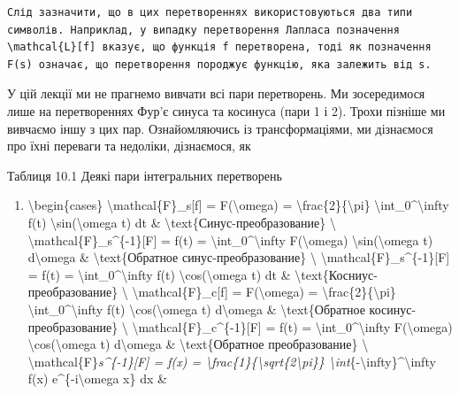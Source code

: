 \documentclass[
]{article}
\providecommand{\tightlist}{%
  \setlength{\itemsep}{0pt}\setlength{\parskip}{0pt}}
\begin{document}
\begin{verbatim}
Слід зазначити, що в цих перетвореннях використовуються два типи символів. Наприклад, у випадку перетворення Лапласа позначення \mathcal{L}[f] вказує, що функція f перетворена, тоді як позначення F(s) означає, що перетворення породжує функцію, яка залежить від s.
\end{verbatim}

У цій лекції ми не прагнемо вивчати всі пари перетворень. Ми
зосередимося лише на перетвореннях Фур'є синуса та косинуса (пари 1 і
2). Трохи пізніше ми вивчаємо іншу з цих пар. Ознайомляючись із
трансформаціями, ми дізнаємося про їхні переваги та недоліки,
дізнаємося, як

Таблиця 10.1 Деякі пари інтегральних перетворень

\begin{enumerate}
\def\labelenumi{\arabic{enumi}.}
\tightlist
\item
  \textbackslash begin\{cases\} \textbackslash mathcal\{F\}\_s{[}f{]} =
  F(\textbackslash omega) =
  \textbackslash frac\{2\}\{\textbackslash pi\}
  \textbackslash int\_0\^{}\textbackslash infty f(t)
  \textbackslash sin(\textbackslash omega t) dt \&
  \textbackslash text\{Синус-преобразование\} \textbackslash{}
  \textbackslash mathcal\{F\}\_s\^{}\{-1\}{[}F{]} = f(t) =
  \textbackslash int\_0\^{}\textbackslash infty F(\textbackslash omega)
  \textbackslash sin(\textbackslash omega t) d\textbackslash omega \&
  \textbackslash text\{Обратное синус-преобразование\} \textbackslash{}
  \textbackslash mathcal\{F\}\_s\^{}\{-1\}{[}F{]} = f(t) =
  \textbackslash int\_0\^{}\textbackslash infty f(t)
  \textbackslash cos(\textbackslash omega t) dt \&
  \textbackslash text\{Косниус-преобразование\} \textbackslash{}
  \textbackslash mathcal\{F\}\_c{[}f{]} = F(\textbackslash omega) =
  \textbackslash frac\{2\}\{\textbackslash pi\}
  \textbackslash int\_0\^{}\textbackslash infty f(t)
  \textbackslash cos(\textbackslash omega t) d\textbackslash omega \&
  \textbackslash text\{Обратное косинус-преобразование\}
  \textbackslash{} \textbackslash mathcal\{F\}\_c\^{}\{-1\}{[}F{]} =
  f(t) = \textbackslash int\_0\^{}\textbackslash infty
  F(\textbackslash omega) \textbackslash cos(\textbackslash omega t)
  d\textbackslash omega \& \textbackslash text\{Обратное
  преобразование\} \textbackslash{}
  \textbackslash mathcal\{F\}\emph{s\^{}\{-1\}{[}F{]} = f(x) =
  \textbackslash frac\{1\}\{\textbackslash sqrt\{2\textbackslash pi\}\}
  \textbackslash int}\{-\textbackslash infty\}\^{}\textbackslash infty
  f(x) e\^{}\{-i\textbackslash omega x\} dx \&

\end{enumerate}
\end{document}
